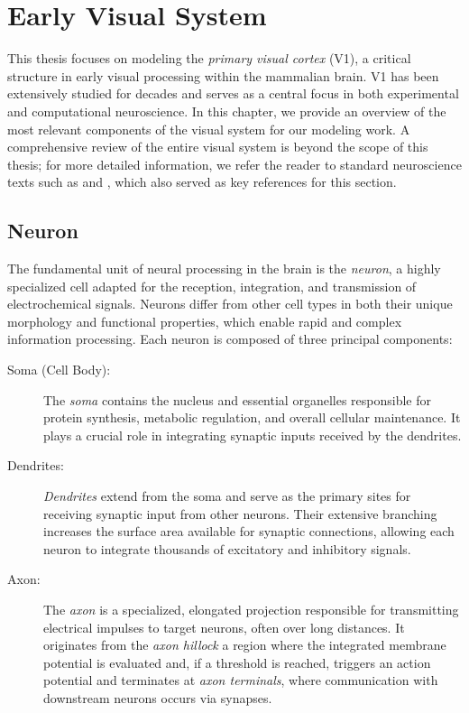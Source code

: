 \chapter{Early Visual System}
\label{chap:visual_system}
This thesis focuses on modeling the \emph{primary visual cortex} (V1), a critical structure in early visual processing within the mammalian brain. V1 has been extensively studied for decades \citep{hubel1965receptive} and serves as a central focus in both experimental and computational neuroscience. In this chapter, we provide an overview of the most relevant components of the visual system for our modeling work. A comprehensive review of the entire visual system is beyond the scope of this thesis; for more detailed information, we refer the reader to standard neuroscience texts such as \citet{bear2020neuroscience} and \citet{goebel2004visual}, which also served as key references for this section.

\section{Neuron}
\label{sec:neuron}

The fundamental unit of neural processing in the brain is the \emph{neuron}, a highly specialized cell adapted for the reception, integration, and transmission of electrochemical signals. Neurons differ from other cell types in both their unique morphology and functional properties, which enable rapid and complex information processing. Each neuron is composed of three principal components:

\begin{description}
    \item[Soma (Cell Body):] The \emph{soma} contains the nucleus and essential organelles responsible for protein synthesis, metabolic regulation, and overall cellular maintenance. It plays a crucial role in integrating synaptic inputs received by the dendrites.

    \item[Dendrites:] \emph{Dendrites} extend from the soma and serve as the primary sites for receiving synaptic input from other neurons. Their extensive branching increases the surface area available for synaptic connections, allowing each neuron to integrate thousands of excitatory and inhibitory signals.

    \item[Axon:] The \emph{axon} is a specialized, elongated projection responsible for transmitting electrical impulses to target neurons, often over long distances. It originates from the \emph{axon hillock} a region where the integrated membrane potential is evaluated and, if a threshold is reached, triggers an action potential and terminates at \emph{axon terminals}, where communication with downstream neurons occurs via synapses.
\end{description}


